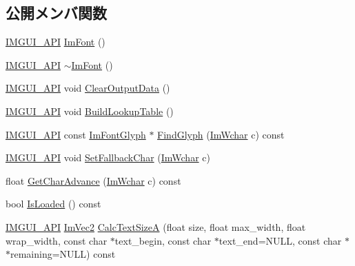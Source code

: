 \subsection*{公開メンバ関数}
\begin{DoxyCompactItemize}
\item 
\mbox{\hyperlink{imgui_8h_a43829975e84e45d1149597467a14bbf5}{I\+M\+G\+U\+I\+\_\+\+A\+PI}} \mbox{\hyperlink{struct_im_font_a1d35b1eb7c2f6a3a648308531e88e7f1}{Im\+Font}} ()
\item 
\mbox{\hyperlink{imgui_8h_a43829975e84e45d1149597467a14bbf5}{I\+M\+G\+U\+I\+\_\+\+A\+PI}} \mbox{\hyperlink{struct_im_font_a377366ed7c5d076363ad4760aeff63ec}{$\sim$\+Im\+Font}} ()
\item 
\mbox{\hyperlink{imgui_8h_a43829975e84e45d1149597467a14bbf5}{I\+M\+G\+U\+I\+\_\+\+A\+PI}} void \mbox{\hyperlink{struct_im_font_aecf7773b1c40b433f91ee245f463de12}{Clear\+Output\+Data}} ()
\item 
\mbox{\hyperlink{imgui_8h_a43829975e84e45d1149597467a14bbf5}{I\+M\+G\+U\+I\+\_\+\+A\+PI}} void \mbox{\hyperlink{struct_im_font_a04b3a1437bd0032722bbbd3613941162}{Build\+Lookup\+Table}} ()
\item 
\mbox{\hyperlink{imgui_8h_a43829975e84e45d1149597467a14bbf5}{I\+M\+G\+U\+I\+\_\+\+A\+PI}} const \mbox{\hyperlink{struct_im_font_glyph}{Im\+Font\+Glyph}} $\ast$ \mbox{\hyperlink{struct_im_font_ac6a773b73c6406fd8f08c4c93213a501}{Find\+Glyph}} (\mbox{\hyperlink{imgui_8h_af2c7badaf05a0008e15ef76d40875e97}{Im\+Wchar}} c) const
\item 
\mbox{\hyperlink{imgui_8h_a43829975e84e45d1149597467a14bbf5}{I\+M\+G\+U\+I\+\_\+\+A\+PI}} void \mbox{\hyperlink{struct_im_font_a1f504f78cc066db20ea2d688e73a560b}{Set\+Fallback\+Char}} (\mbox{\hyperlink{imgui_8h_af2c7badaf05a0008e15ef76d40875e97}{Im\+Wchar}} c)
\item 
float \mbox{\hyperlink{struct_im_font_adffcff4e4e2d17455410bd4ba76b42e4}{Get\+Char\+Advance}} (\mbox{\hyperlink{imgui_8h_af2c7badaf05a0008e15ef76d40875e97}{Im\+Wchar}} c) const
\item 
bool \mbox{\hyperlink{struct_im_font_a97dafa61cc94e84be396d69b0d42b1ce}{Is\+Loaded}} () const
\item 
\mbox{\hyperlink{imgui_8h_a43829975e84e45d1149597467a14bbf5}{I\+M\+G\+U\+I\+\_\+\+A\+PI}} \mbox{\hyperlink{struct_im_vec2}{Im\+Vec2}} \mbox{\hyperlink{struct_im_font_ad67f64fd206ad197f4b93b1a1ae27cfe}{Calc\+Text\+SizeA}} (float size, float max\+\_\+width, float wrap\+\_\+width, const char $\ast$text\+\_\+begin, const char $\ast$text\+\_\+end=N\+U\+LL, const char $\ast$$\ast$remaining=N\+U\+LL) const
$$
\end{DoxyCompactItemize}
